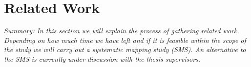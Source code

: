 \iffalse  \fi
\chapter{Related Work}
\textit{Summary: In this section we will explain the process of gathering related work. Depending on how much time we have left and if it is feasible within the scope of the study we will carry out a systematic mapping study (SMS). An alternative to the SMS is currently under discussion with the thesis supervisors. }


